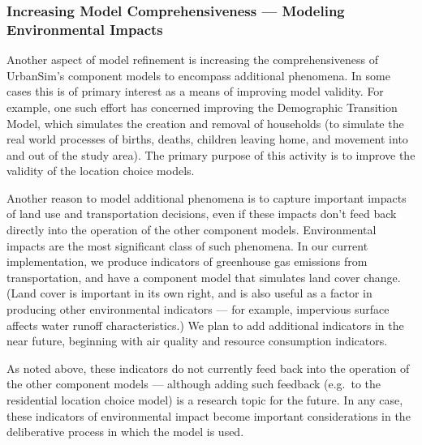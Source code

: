 \subsubsection{Increasing Model Comprehensiveness --- Modeling
Environmental Impacts}

Another aspect of model refinement is increasing the comprehensiveness of
UrbanSim's component models to encompass additional phenomena.  In some
cases this is of primary interest as a means of improving model validity.
For example, one such effort has concerned improving the Demographic
Transition Model, which simulates the creation and removal of households
(to simulate the real world processes of births, deaths, children leaving
home, and movement into and out of the study area).  The primary purpose of
this activity is to improve the validity of the location choice models.


Another reason to model additional phenomena is to capture important
impacts of land use and transportation decisions, even if these impacts
don't feed back directly into the operation of the other component models.
Environmental impacts are the most significant class of such phenomena.  In
our current implementation, we produce indicators of greenhouse gas
emissions from transportation, and have a component model that simulates
land cover change.  (Land cover is important in its own right, and is also
useful as a factor in producing other environmental indicators --- for
example, impervious surface affects water runoff characteristics.)  We plan
to add additional indicators in the near future, beginning with air quality
and resource consumption indicators.

As noted above, these indicators do not currently feed back into the
operation of the other component models --- although adding such feedback
(e.g.\ to the residential location choice model) is a research topic for
the future.  In any case, these indicators of environmental impact become
important considerations in the deliberative process in which the model is
used.

